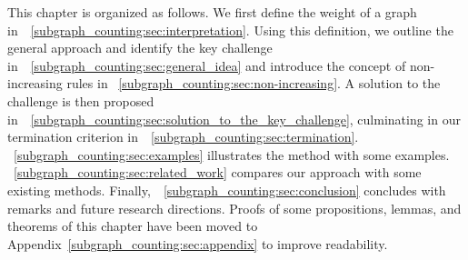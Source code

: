    
This chapter is organized as follows.
We first define the weight of a graph in~\textsection~\ref{subgraph_counting:sec:interpretation}. 
Using this definition, we outline the general approach and identify the key challenge in~\textsection~\ref{subgraph_counting:sec:general_idea} and introduce the concept of non-increasing rules in \textsection~\ref{subgraph_counting:sec:non-increasing}. 
A solution to the challenge is then proposed in~\textsection~\ref{subgraph_counting:sec:solution_to_the_key_challenge}, culminating in our termination criterion in~\textsection~\ref{subgraph_counting:sec:termination}.
\textsection~\ref{subgraph_counting:sec:examples} illustrates the method with some examples.
\textsection~\ref{subgraph_counting:sec:related_work} compares our approach with some existing methods.
Finally,~\textsection~\ref{subgraph_counting:sec:conclusion} concludes with remarks and future research directions. Proofs of some propositions, lemmas, and theorems of this chapter
 have been moved to Appendix~\ref{subgraph_counting:sec:appendix} to improve readability.